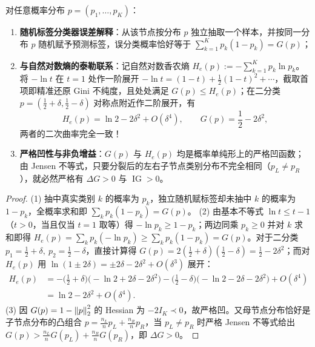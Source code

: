 \begin{thmBox}
\begin{proposition}\label{prop:gini-entropy}
对任意概率分布 $p = (p_1, \dots, p_K)$：
\begin{enumerate}
  \item \textbf{随机标签分类器误差解释}：从该节点按分布 $p$ 独立抽取一个样本，并按同一分布 $p$ 随机赋予预测标签，误分类概率恰好等于 $\sum_{k=1}^K p_k(1 - p_k) = G(p)$；
  \item \textbf{与自然对数熵的泰勒联系}：记自然对数香农熵 $H_e(p) := -\sum_{k=1}^K p_k \ln p_k$。将 $-\ln t$ 在 $t = 1$ 处作一阶展开 $-\ln t = (1 - t) + \frac{1}{2}(1-t)^2 + \cdots$，截取首项即精准还原 Gini 不纯度，且处处满足 $G(p) \le H_e(p)$；在二分类 $p = (\frac{1}{2}+\delta, \frac{1}{2}-\delta)$ 对称点附近作二阶展开，有
  \[
    H_e(p) = \ln 2 - 2\delta^2 + O(\delta^4), \qquad G(p) = \frac{1}{2} - 2\delta^2,
  \]
  两者的二次曲率完全一致！
  \item \textbf{严格凹性与非负增益}：$G(p)$ 与 $H_e(p)$ 均是概率单纯形上的严格凹函数；由 Jensen 不等式，只要分裂后的左右子节点类别分布不完全相同（$p_L \neq p_R$），就必然严格有 $\Delta G > 0$ 与 $\operatorname{IG} > 0$。
\end{enumerate}
\end{proposition}
\end{thmBox}

\begin{proof}
(1) 抽中真实类别 $k$ 的概率为 $p_k$，独立随机赋标签却未抽中 $k$ 的概率为 $1 - p_k$，全概率求和即 $\sum_k p_k(1 - p_k) = G(p)$。
(2) 由基本不等式 $\ln t \le t - 1$（$t > 0$，当且仅当 $t = 1$ 取等）得 $-\ln p_k \ge 1 - p_k$；两边同乘 $p_k \ge 0$ 并对 $k$ 求和即得 $H_e(p) = \sum_k p_k(-\ln p_k) \ge \sum_k p_k(1 - p_k) = G(p)$。对于二分类 $p_1 = \frac{1}{2} + \delta,\ p_2 = \frac{1}{2} - \delta$，直接计算得 $G(p) = 2(\frac{1}{2}+\delta)(\frac{1}{2}-\delta) = \frac{1}{2} - 2\delta^2$；而对 $H_e(p)$ 用 $\ln(1 \pm 2\delta) = \pm 2\delta - 2\delta^2 + O(\delta^3)$ 展开：
\begin{align*}
  H_e(p) &= -\Big(\frac{1}{2}+\delta\Big)\Big(-\ln 2 + 2\delta - 2\delta^2\Big) - \Big(\frac{1}{2}-\delta\Big)\Big(-\ln 2 - 2\delta - 2\delta^2\Big) + O(\delta^4) \\
         &= \ln 2 - 2\delta^2 + O(\delta^4).
\end{align*}
(3) 因 $G(p) = 1 - \left\|p\right\|_2^2$ 的 Hessian 为 $-2 I_K \prec 0$，故严格凹。又母节点分布恰好是子节点分布的凸组合 $p = \frac{n_L}{n} p_L + \frac{n_R}{n} p_R$，当 $p_L \neq p_R$ 时严格 Jensen 不等式给出 $G(p) > \frac{n_L}{n} G(p_L) + \frac{n_R}{n} G(p_R)$，即 $\Delta G > 0$。
\end{proof}

